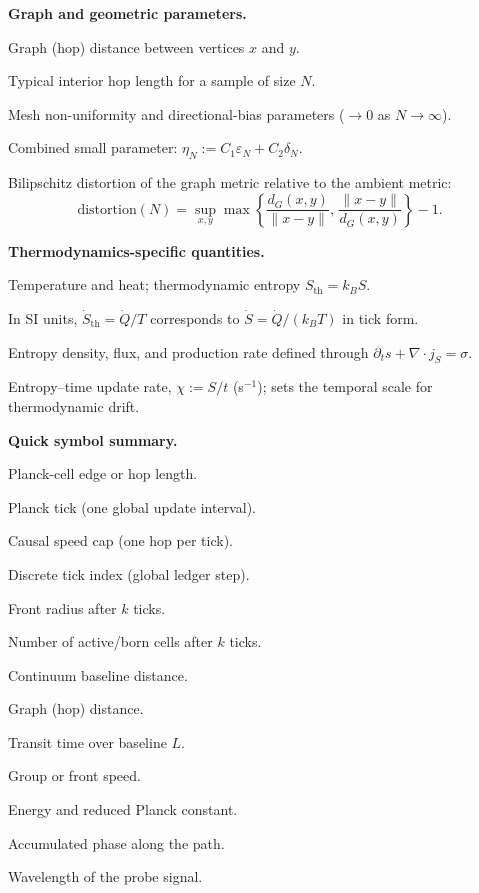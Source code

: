 \noindent\textbf{Graph and geometric parameters.}
\begin{description}[leftmargin=2.4em,labelsep=0.8em]
  \item[\(d_G(x,y)\)] Graph (hop) distance between vertices \(x\) and \(y\).
  \item[\(\ell_N\)] Typical interior hop length for a sample of size \(N\).
  \item[\(\varepsilon_N,\,\delta_N\)] Mesh non-uniformity and directional-bias parameters (\(\to 0\) as \(N\to\infty\)).
  \item[\(\eta_N\)] Combined small parameter: \(\eta_N := C_1\varepsilon_N + C_2\delta_N.\)
  \item[\(\mathrm{distortion}(N)\)] Bilipschitz distortion of the graph metric relative to the ambient metric:
  \[
    \mathrm{distortion}(N)
      = \sup_{x,y}
        \max\!\left\{
          \frac{d_G(x,y)}{\|x-y\|},\,
          \frac{\|x-y\|}{d_G(x,y)}
        \right\}-1.
  \]
\end{description}

\noindent\textbf{Thermodynamics-specific quantities.}
\begin{description}[leftmargin=2.4em,labelsep=0.8em]
  \item[\(T,\,Q\)] Temperature and heat; thermodynamic entropy \(S_{\mathrm{th}} = k_B S\).
  \item[\(\dot S\)] In SI units, \(\dot S_{\mathrm{th}} = \dot Q / T\) corresponds to \(\dot S = \dot Q / (k_B T)\) in tick form.
  \item[\(s,\, j_S,\, \sigma\)] Entropy density, flux, and production rate defined through  
        \(\partial_t s + \nabla\!\cdot j_S = \sigma.\)
  \item[\(\chi\)] Entropy–time update rate, \(\chi := S/t\) (s\(^{-1}\)); sets the temporal scale for thermodynamic drift.
\end{description}

\bigskip
\noindent\textbf{Quick symbol summary.}
\begin{description}[leftmargin=2.4em,labelsep=0.8em]
  \item[\(\ell_P\)] Planck-cell edge or hop length.
  \item[\(t_P\)] Planck tick (one global update interval).
  \item[\(c=\ell_P/t_P\)] Causal speed cap (one hop per tick).
  \item[\(k\)] Discrete tick index (global ledger step).
  \item[\(R(k)\)] Front radius after \(k\) ticks.
  \item[\(N(k)\)] Number of active/born cells after \(k\) ticks.
  \item[\(L\)] Continuum baseline distance.
  \item[\(d_G\)] Graph (hop) distance.
  \item[\(T(L)\)] Transit time over baseline \(L\).
  \item[\(v_g\)] Group or front speed.
  \item[\(E,\,\hbar\)] Energy and reduced Planck constant.
  \item[\(\Delta\phi\)] Accumulated phase along the path.
  \item[\(\lambda\)] Wavelength of the probe signal.
\end{description}
